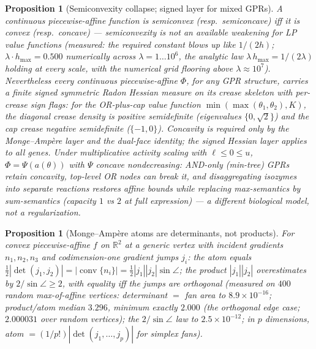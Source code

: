 \documentclass[11pt,a4paper]{article}
\theoremstyle{plain}
\newtheorem{proposition}[theorem]{Proposition}
\theoremstyle{definition}
\theoremstyle{remark}
\newcommand{\RR}{\mathbb{R}}
\begin{document}
\begin{proposition}[Semiconvexity collapse; signed layer for mixed
GPRs]\label{prop:semiconvex}
A continuous piecewise-affine function is semiconvex (resp.\
semiconcave) iff it is convex (resp.\ concave) --- semiconvexity is
not an available weakening for LP value functions (measured: the
required constant blows up like $1/(2h)$; $\lambda \cdot h_{\max}
= 0.500$ numerically across $\lambda = 1 \dots 10^{6}$, the analytic
law $\lambda\, h_{\max} = 1/(2\lambda)$ holding at every scale,
with the numerical grid flooring above $\lambda \approx 10^{7}$).
Nevertheless
every continuous piecewise-affine $\Phi$, for any GPR structure,
carries a finite \emph{signed} symmetric Radon Hessian measure on
its crease skeleton with per-crease sign flags: for the OR-plus-cap
value function $\min(\max(\theta_1,\theta_2), K)$, the diagonal
crease density is positive semidefinite (eigenvalues
$\{0,\sqrt2\}$) and the cap crease negative semidefinite
($\{-1,0\}$). Concavity is required only by the
Monge--Amp\`ere layer and the dual-face identity; the signed Hessian
layer applies to all genes. Under multiplicative activity scaling
with $\ell \le 0 \le u$, $\Phi = \Psi(a(\theta))$ with $\Psi$
concave nondecreasing: AND-only (min-tree) GPRs retain concavity,
top-level OR nodes can break it, and disaggregating isozymes into
separate reactions restores affine bounds while replacing
max-semantics by sum-semantics (capacity $1$ vs $2$ at full
expression) --- a different biological model, not a regularization.
\end{proposition}

\begin{proposition}[Monge--Amp\`ere atoms are determinants, not
products]\label{prop:maatom}
For convex piecewise-affine $f$ on $\RR^2$ at a generic vertex with
incident gradients $n_1, n_2, n_3$ and codimension-one gradient jumps
$j_i$: the atom equals
$\tfrac12|\det(j_1, j_2)| =
|\operatorname{conv}\{n_i\}| =
\tfrac12 |j_1| |j_2| \sin\angle$; the product $|j_1||j_2|$
overestimates by $2/\sin\angle \ge 2$, with equality iff the jumps
are orthogonal (measured on $400$ random max-of-affine vertices:
determinant $=$ fan area to $8.9 \times 10^{-16}$; product/atom
median $3.296$, minimum exactly $2.000$ (the orthogonal edge case;
$2.000031$ over random vertices); the $2/\sin\angle$ law to
$2.5 \times 10^{-12}$; in $p$ dimensions, atom $=
(1/p!)|\det(j_1,\dots,j_p)|$ for simplex fans).
\end{proposition}
\end{document}
